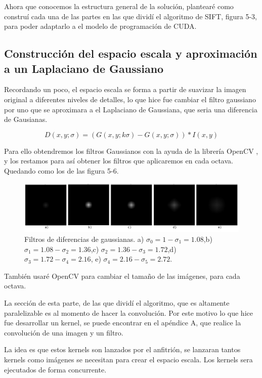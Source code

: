 Ahora que conocemos la estructura general de la solución, plantearé como construí cada una de las partes en las que dividí el algoritmo de SIFT, figura 5-3,  para poder adaptarlo a el modelo de programación de CUDA.

\subsection{Construcción del espacio escala y aproximación a un Laplaciano de Gaussiano}

Recordando un poco, el espacio escala se forma a partir de suavizar la imagen original a diferentes niveles de detalles, lo que hice fue cambiar el filtro gaussiano por uno que se aproximara a el Laplaciano de Gaussiana, que seria una diferencia de Gausianas. 

$$D(x,y;\sigma) = (G(x,y;k\sigma) - G(x,y;\sigma)) * I(x,y)$$ 

Para ello obtendremos los filtros Gaussianos con la ayuda de la librería OpenCV \cite{Opencv}, y los restamos para así obtener los filtros que aplicaremos en cada octava. Quedando como los de las figura 5-6.


\begin{figure}[h]
			\centering
				\includegraphics[scale=0.2]{img/DoG.jpg}
			\caption{Filtros de diferencias de gaussianas. a) $\sigma_{0}=1-\sigma_{1}=1.08$,b) $\sigma_{1}=1.08-\sigma_{2}=1.36$,c) $\sigma_{2}=1.36-\sigma_{3}=1.72$,d) $\sigma_{3}=1.72-\sigma_{4}=2.16$, e) $\sigma_{4}=2.16-\sigma_{5}=2.72$. }
\end{figure}



 


También usaré OpenCV para cambiar el tamaño de las imágenes, para cada octava.

La sección de esta parte, de las que dividí el algoritmo, que es altamente paralelizable es al momento de hacer la convolución. Por este motivo lo que hice fue desarrollar un kernel, se puede encontrar en el apéndice A, que realice la convolución de una imagen y un filtro.

\pagebreak
 
La idea es que estos kernels son lanzados por el anfitrión, se lanzaran tantos kernels como imágenes se necesitan para crear el espacio escala. Los kernels sera ejecutados de forma concurrente. 

